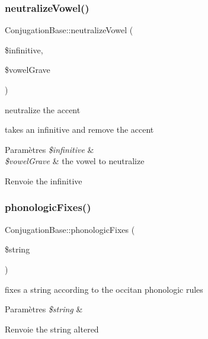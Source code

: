 \subsubsection{\texorpdfstring{neutralize\+Vowel()}{neutralizeVowel()}}
{\footnotesize\ttfamily Conjugation\+Base\+::neutralize\+Vowel (\begin{DoxyParamCaption}\item[{}]{\$infinitive,  }\item[{}]{\$vowel\+Grave }\end{DoxyParamCaption})\hspace{0.3cm}{\ttfamily [protected]}}



neutralize the accent 

takes an infinitive and remove the accent


\begin{DoxyParams}{Paramètres}
{\em \$infinitive} & \\
\hline
{\em \$vowel\+Grave} & the vowel to neutralize \\
\hline
\end{DoxyParams}
\begin{DoxyReturn}{Renvoie}
the infinitive 
\end{DoxyReturn}
\hypertarget{class_conjugation_base_a4e623e786e39aecdaf26913685f9f040}{}\label{class_conjugation_base_a4e623e786e39aecdaf26913685f9f040} 
\subsubsection{\texorpdfstring{phonologic\+Fixes()}{phonologicFixes()}}
{\footnotesize\ttfamily Conjugation\+Base\+::phonologic\+Fixes (\begin{DoxyParamCaption}\item[{}]{\$string }\end{DoxyParamCaption})\hspace{0.3cm}{\ttfamily [protected]}}



fixes a string according to the occitan phonologic rules 


\begin{DoxyParams}{Paramètres}
{\em \$string} & \\
\hline
\end{DoxyParams}
\begin{DoxyReturn}{Renvoie}
the string altered 
\end{DoxyReturn}


